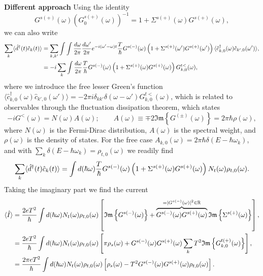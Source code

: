 \textbf{Different approach} Using the identity 
\begin{equation}
    G^{s(+)}(\omega)\left(G^{s(+)}_0(\omega)\right)^{-1} = 1+\Sigma^{s(+)}(\omega)G^{s(+)}(\omega), 
\end{equation}
we can also write
\begin{align}
    \sum_k \langle{\hat{d}^\dagger(t)\hat{c}_k(t)}\rangle &= \sum_{k,k'}\int\int\frac{d\omega}{2\pi}\frac{d\omega'}{2\pi}e^{-i(\omega'-\omega)t} \frac{T}{\hbar} G^{s(-)}(\omega)\left(1 +  \Sigma^{s(+)}(\omega')G^{s(+)}(\omega')\right)\langle\hat{c}^\dagger_{k,0}(\omega)\hat{c}_{k',0}(\omega')\rangle,\nonumber\\
    &= -i\sum_k\int\frac{d\omega}{2\pi}\frac{T}{\hbar} G^{s(-)}(\omega)\left(1+\Sigma^{s(+)}(\omega)G^{s(+)}(\omega)\right)G^{t<}_{k,0}(\omega),
\end{align}
where we introduce the free lesser Green's function $\langle\hat{c}^\dagger_{k,0}(\omega)\hat{c}_{k',0}(\omega')\rangle = -2\pi i \delta_{kk'} \delta(\omega-\omega')G^{t<}_{k,0}(\omega)$, which is related to observables through the fluctuation dissipation theorem, which states
\begin{equation}
    -i G^<(\omega) = N(\omega)A(\omega); \qquad A(\omega)\equiv\mp2\mathfrak{Im}\left\{G^{(\pm)}(\omega)\right\}=2\pi\hbar\rho(\omega),
\end{equation}
where $N(\omega)$ is the Fermi-Dirac distribution, $A(\omega)$ is the spectral weight, and $\rho(\omega)$ is the density of states. For the free case $A_{k,0}(\omega) = 2\pi\hbar\delta(E-\hbar\omega_k)$, and with $\sum_k\delta(E-\hbar\omega_k) = \rho_{t,0}(\omega)$ we readily find
\begin{equation}
     \sum_k \langle{\hat{d}^\dagger(t)\hat{c}_k(t)}\rangle = \int d(\hbar\omega) \frac{T}{\hbar} G^{s(-)}(\omega)\left(1 + \Sigma^{s(+)}(\omega)G^{s(+)}(\omega)\right)N_t(\omega)\rho_{t,0}(\omega).
\end{equation}
Taking the imaginary part we find the current
\begin{align}
    \langle\hat{I}\rangle &= \frac{2eT^2}{\hbar}\int d(\hbar\omega)N_t(\omega)\rho_{t,0}(\omega)\left[\mathfrak{Im}\left\{G^{s(-)}(\omega)\right\} + \overbrace{G^{s(-)}(\omega) G^{s(+)}(\omega)}^{=|G^{s(-)}(\omega)|^2\in \mathbb{R}}\mathfrak{Im}\left\{\Sigma^{s(+)}(\omega)\right\}\right],\nonumber \\
    &= \frac{2 eT^2}{\hbar}\int d(\hbar\omega)N_t(\omega)\rho_{t,0}(\omega)\left[\pi\rho_s(\omega) + G^{s(-)}(\omega) G^{s(+)}(\omega)\sum_kT^2\mathfrak{Im}\left\{G^{t(+)}_{k,0}(\omega)\right\}\right],\nonumber\\
    &= \frac{2\pi eT^2}{\hbar}\int d(\hbar\omega)N_t(\omega)\rho_{t,0}(\omega)\left[\rho_s(\omega) - T^2 G^{s(-)}(\omega) G^{s(+)}(\omega)\rho_{t,0}(\omega)\right].
\end{align}

